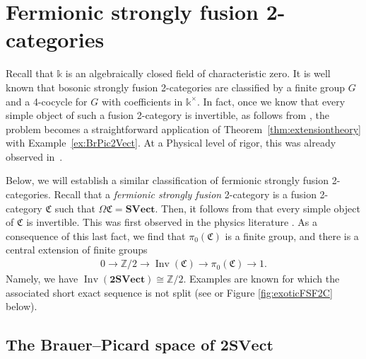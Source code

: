 \documentclass[10pt,a4paper]{amsart}
\numberwithin{equation}{section}
\begin{document}
\section{Fermionic strongly fusion 2-categories}\label{sec:FSF2Cs}

Recall that $\mathds{k}$ is an algebraically closed field of characteristic zero. It is well known that bosonic strongly fusion 2-categories are classified by a finite group $G$ and a 4-cocycle for $G$ with coefficients in $\mathds{k}^{\times}$. In fact, once we know that every simple object of such a fusion 2-category is invertible, as follows from \cite[Theorem~A]{JFY}, the problem becomes a straightforward application of Theorem~\ref{thm:extensiontheory} with Example~\ref{ex:BrPic2Vect}. At a Physical level of rigor, this was already observed in~\cite{LKW}.

Below, we will establish a similar classification of fermionic strongly fusion 2-categories. Recall that a \textit{fermionic strongly fusion} 2-category is a fusion 2-category $\mathfrak{C}$ such that $\Omega\mathfrak{C}=\mathbf{SVect}$. Then, it follows from \cite[Theorem~B]{JFY} that every simple object of $\mathfrak{C}$ is invertible. This was first observed in the physics literature \cite{LW}. As a consequence of this last fact, we find that $\pi_0(\mathfrak{C})$ is a finite group, and there is a central extension of finite groups
\begin{gather*}
0\rightarrow \mathbb{Z}/2\rightarrow \operatorname{Inv}(\mathfrak{C})\rightarrow \pi_0(\mathfrak{C})\rightarrow 1.
\end{gather*}
 Namely, we have $\operatorname{Inv}(\mathbf{2SVect})\cong \mathbb{Z}/2$. Examples are known for which the associated short exact sequence is not split (see \cite[Example 2.1.27]{DR} or Figure \ref{fig:exoticFSF2C} below).

\subsection[The Brauer--Picard space of 2SVect]{The Brauer--Picard space of $\mathbf{2SVect}$}\label{sub:fermionicclassification}
\end{document}
